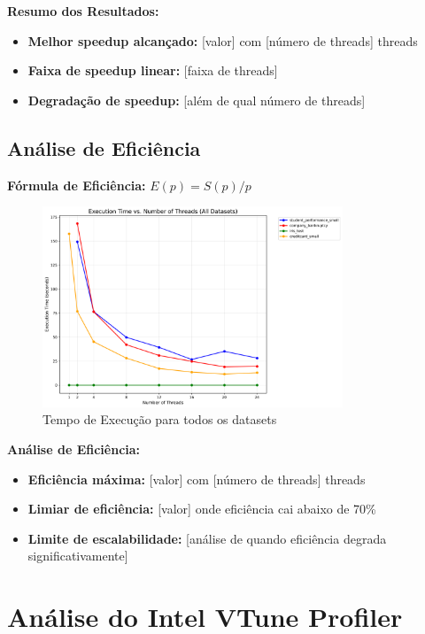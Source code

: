 \documentclass[a4paper,11pt]{article}
\begin{document}
\textbf{Resumo dos Resultados:}
\begin{itemize}
    \item \textbf{Melhor speedup alcançado:} [valor] com [número de threads] threads
    \item \textbf{Faixa de speedup linear:} [faixa de threads]
    \item \textbf{Degradação de speedup:} [além de qual número de threads]
\end{itemize}

\subsection{Análise de Eficiência}

\textbf{Fórmula de Eficiência:} $E(p) = S(p) / p$

\begin{figure}[H]
    \centering
    \includegraphics[width=0.8\textwidth]{../../pcad_results/graphs/all_datasets_execution_time.png}
    \caption{Tempo de Execução para todos os datasets}
\end{figure}

\textbf{Análise de Eficiência:}
\begin{itemize}
    \item \textbf{Eficiência máxima:} [valor] com [número de threads] threads
    \item \textbf{Limiar de eficiência:} [valor] onde eficiência cai abaixo de 70\%
    \item \textbf{Limite de escalabilidade:} [análise de quando eficiência degrada significativamente]
\end{itemize}

\section{Análise do Intel VTune Profiler}
\end{document}
